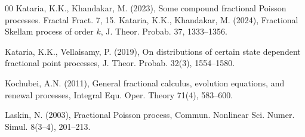 \documentclass[12pt, twoside, english, headsepline]{article}
\theoremstyle{definition} %
\numberwithin{equation}{section} %
\begin{document}
{\begin{thebibliography}{00}
Kataria, K.K., Khandakar, M. (2023), Some compound fractional Poisson processes. Fractal Fract. 7, 15.
%
Kataria, K.K., Khandakar, M. (2024), Fractional Skellam process of order $k$, J. Theor. Probab. 37, 1333--1356.

Kataria, K.K., Vellaisamy, P. (2019), On distributions of certain state dependent fractional point processes, J. Theor. Probab. 32(3), 1554--1580.
%
%
%


Kochubei, A.N. (2011), General fractional calculus, evolution equations, and renewal processes, Integral Equ. Oper. Theory 71(4), 583--600.

%
%
%
%
%
Laskin, N. (2003), Fractional Poisson process, Commun. Nonlinear Sci. Numer. Simul. 8(3--4), 201--213.


\end{thebibliography}}
\end{document}
